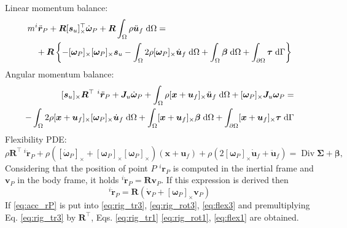 \documentclass{svjour3}                     %
\DeclareMathOperator*{\Div}{Div}
\newcommand{\crmat}[1]{\ensuremath{[#1]_{\times}}}
\begin{document}
\indent Linear momentum balance:
\begin{equation}
\label{eq:rig_tr3}
\begin{split}
&m ^{i}\ddot{\bm{r}}_P + \bm{R} \crmat{\bm{s}_u}^\top \dot{\bm{\omega}}_P  + \bm{R} \int_{\Omega} \rho \ddot{\bm{u}}_f \d{\Omega} = \\
&\quad + \bm{R} \left\{ -\crmat{\bm{\omega}_P} \crmat{\bm{\omega}_P} \bm{s}_u -  \int_{\Omega} 2 \rho \crmat{\bm{\omega}_P} \dot{\bm{u}}_f \d{\Omega} +  \int_{\Omega} \bm\beta \d{\Omega} +  \int_{\partial \Omega} \bm\tau \d{\Gamma}  \right\} 
\end{split}
\end{equation}
\indent Angular momentum balance:
\begin{equation}
\label{eq:rig_rot3}
\begin{split}
\crmat{\bm{s}_u} {\bm{R}^{\top}} \ ^{i}\ddot{\bm{r}}_P + \bm{J}_u \dot{\bm\omega}_P + \int_{\Omega} \rho \crmat{\bm{x}+\bm{u}_f} \ddot{\bm{u}}_f \d{\Omega} + \crmat{\bm{\omega}_P} \bm{J}_u \bm{\omega}_P = \\ 
- \int_{\Omega} 2\rho \crmat{\bm{x}+\bm{u}_f} \crmat{\bm\omega_P} \dot{\bm{u}}_f \d{\Omega} + \int_{\Omega}\crmat{\bm{x}+\bm{u}_f} \bm\beta \d{\Omega} + \int_{\partial \Omega}\crmat{\bm{x}+\bm{u}_f} \bm\tau \d{\Gamma} \\
\end{split}
\end{equation}
\indent Flexibility PDE:
\begin{equation}
\label{eq:flex3}
\rho  {\bm{R}^{\top}} \ ^{i}\ddot{\bm{r}}_P + \rho (\crmat{\dot{\bm\omega}_P} + \crmat{\bm{\omega}_P}\crmat{\bm{\omega}_P})(\bm{x}+\bm{u}_f) + \rho (2 \crmat{\bm{\omega}_P} \dot{\bm{u}}_f + \ddot{\bm{u}}_f) = \Div{\bm\Sigma} + \bm\beta,
\end{equation}
Considering that the position of point $P$ $^{i}{\bm{r}}_P$ is computed in the inertial frame and $\bm{v}_P$ in the body frame, it holds $^{i}\dot{\bm{r}}_P = \bm{R} \bm{v}_P$. If this expression is derived then
\begin{equation}
\label{eq:acc_rP}
^{i}\ddot{\bm{r}}_P = \bm{R} \left(\dot{\bm{v}}_P + \crmat{\bm{\omega}_P} \bm{v}_P \right)
\end{equation}
If \eqref{eq:acc_rP} is put into \eqref{eq:rig_tr3}, \eqref{eq:rig_rot3}, \eqref{eq:flex3} and premultiplying  Eq. \eqref{eq:rig_tr3} by $\bm{R}^\top$, Eqs. \eqref{eq:rig_tr1} \eqref{eq:rig_rot1}, \eqref{eq:flex1} are obtained.
\end{document}
